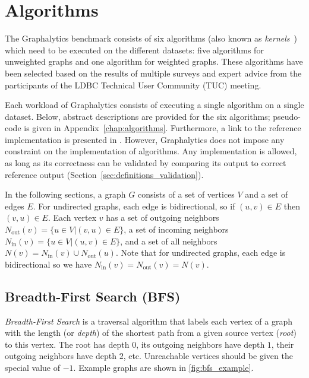 \section{Algorithms}
\label{sec:definition_algorithms}

The Graphalytics benchmark consists of six algorithms (also known as \emph{kernels}~\cite{DBLP:conf/hipc/BaderM05}) which need to be executed on the different datasets: five algorithms for unweighted graphs and one algorithm for weighted graphs. These algorithms have been selected based on the results of multiple surveys and expert advice from the participants of the LDBC Technical User Community (TUC) meeting.

Each workload of Graphalytics consists of executing a single algorithm on a single dataset. Below, abstract descriptions are provided for the six algorithms; pseudo-code is given in Appendix~\ref{chap:algorithms}. Furthermore, a link to the reference implementation is presented in . However, Graphalytics does not impose any constraint on the implementation of algorithms. Any implementation is allowed, as long as its correctness can be validated by comparing its output to correct reference output (Section~\ref{sec:definitions_validation}). 

In the following sections, a graph $G$ consists of a set of vertices $V$ and a set of edges $E$. For undirected graphs, each edge is bidirectional, so if $(u,v)\in E$ then $(v,u)\in E$. Each vertex $v$ has a set of outgoing neighbors
$N_\mathrm{out}(v) = \{u \in V | (v, u) \in E \}$, a set of incoming neighbors
$N_\mathrm{in}(v)  = \{u \in V | (u, v) \in E \}$, and a set of all neighbors
$N(v) = N_\mathrm{in}(v) \cup N_\mathrm{out}(u)$.
Note that for undirected graphs, each edge is bidirectional so we have $N_\mathrm{in}(v) = N_\mathrm{out}(v) = N(v)$.


\subsection{Breadth-First Search (BFS)}
\label{sec:bfs}
\emph{Breadth-First Search} is a traversal algorithm that labels each vertex of a graph with the length (or \emph{depth}) of the shortest path from a given source vertex (\emph{root}) to this vertex. The root has depth $0$, its outgoing neighbors have depth $1$, their outgoing neighbors have depth $2$, etc. Unreachable vertices should be given the special value of $-1$. Example graphs are shown in \autoref{fig:bfs_example}.


